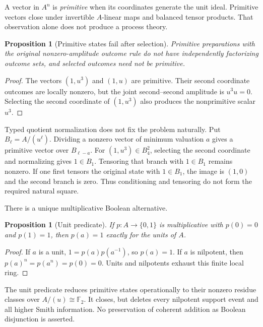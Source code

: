 \documentclass[11pt]{article}
\newtheorem{proposition}[theorem]{Proposition}
\theoremstyle{definition}
\theoremstyle{remark}
\newcommand{\F}{\mathbb F_2}
\begin{document}
A vector in $A^n$ is \emph{primitive} when its coordinates generate the unit ideal. Primitive vectors close under invertible $A$-linear maps and balanced tensor products. That observation alone does not produce a process theory.

\begin{proposition}[Primitive states fail after selection]\label{prop:primitive}
Primitive preparations with the original nonzero-amplitude outcome rule do not have independently factorizing outcome sets, and selected outcomes need not be primitive.
\end{proposition}

\begin{proof}
The vectors $(1,u^3)$ and $(1,u)$ are primitive. Their second coordinate outcomes are locally nonzero, but the joint second--second amplitude is $u^3u=0$. Selecting the second coordinate of $(1,u^3)$ also produces the nonprimitive scalar $u^3$.
\end{proof}

Typed quotient normalization does not fix the problem naturally. Put $B_\ell=A/(u^\ell)$. Dividing a nonzero vector of minimum valuation $a$ gives a primitive vector over $B_{\ell-a}$. For $(1,u^3)\in B_4^2$, selecting the second coordinate and normalizing gives $1\in B_1$. Tensoring that branch with $1\in B_1$ remains nonzero. If one first tensors the original state with $1\in B_1$, the image is $(1,0)$ and the second branch is zero. Thus conditioning and tensoring do not form the required natural square.

There is a unique multiplicative Boolean alternative.

\begin{proposition}[Unit predicate]\label{prop:unit}
If $p:A\to\{0,1\}$ is multiplicative with $p(0)=0$ and $p(1)=1$, then $p(a)=1$ exactly for the units of $A$.
\end{proposition}

\begin{proof}
If $a$ is a unit, $1=p(a)p(a^{-1})$, so $p(a)=1$. If $a$ is nilpotent, then $p(a)^n=p(a^n)=p(0)=0$. Units and nilpotents exhaust this finite local ring.
\end{proof}

The unit predicate reduces primitive states operationally to their nonzero residue classes over $A/(u)\cong\F$. It closes, but deletes every nilpotent support event and all higher Smith information. No preservation of coherent addition as Boolean disjunction is asserted.
\end{document}
